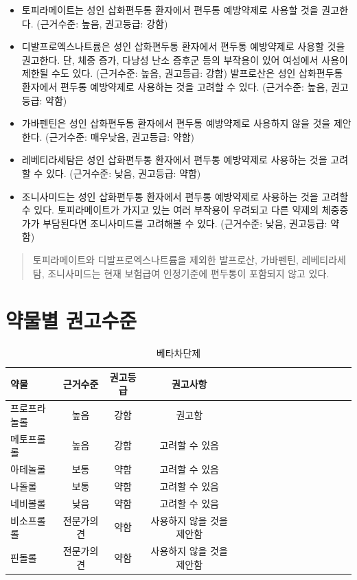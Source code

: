 \documentclass[]{book}
\begin{document}
\begin{itemize}
\item
  토피라메이트는 성인 삽화편두통 환자에서 편두통 예방약제로 사용할 것을 권고한다. (근거수준: 높음, 권고등급: 강함)
\item
  디발프로엑스나트륨은 성인 삽화편두통 환자에서 편두통 예방약제로 사용할 것을 권고한다. 단, 체중 증가, 다낭성 난소 증후군 등의 부작용이 있어 여성에서 사용이 제한될 수도 있다. (근거수준: 높음, 권고등급: 강함) 발프로산은 성인 삽화편두통 환자에서 편두통 예방약제로 사용하는 것을 고려할 수 있다. (근거수준: 높음, 권고등급: 약함)
\item
  가바펜틴은 성인 삽화편두통 환자에서 편두통 예방약제로 사용하지 않을 것을 제안한다. (근거수준: 매우낮음, 권고등급: 약함)
\item
  레베티라세탐은 성인 삽화편두통 환자에서 편두통 예방약제로 사용하는 것을 고려할 수 있다. (근거수준: 낮음, 권고등급: 약함)
\item
  조니사미드는 성인 삽화편두통 환자에서 편두통 예방약제로 사용하는 것을 고려할 수 있다. 토피라메이트가 가지고 있는 여러 부작용이 우려되고 다른 약제의 체중증가가 부담된다면 조니사미드를 고려해볼 수 있다. (근거수준: 낮음, 권고등급: 약함)
\end{itemize}

\begin{quote}
토피라메이트와 디발프로엑스나트륨을 제외한 발프로산, 가바펜틴, 레베티라세탐, 조니사미드는 현재 보험급여 인정기준에 편두통이 포함되지 않고 있다.
\end{quote}

\hypertarget{section-6}{%
\section{약물별 권고수준}\label{section-6}}

\begin{longtable}{lccclccclccclccc}
\caption{\label{tab:unnamed-chunk-2}베타차단제}\\
\toprule
약물 & 근거수준 & 권고등급 & 권고사항\\
\midrule
프로프라놀롤 & 높음 & 강함 & 권고함\\
메토프롤롤 & 높음 & 강함 & 고려할 수 있음\\
아테놀롤 & 보통 & 약함 & 고려할 수 있음\\
나돌롤 & 보통 & 약함 & 고려할 수 있음\\
네비볼롤 & 낮음 & 약함 & 고려할 수 있음\\
\addlinespace
비소프롤롤 & 전문가의견 & 약함 & 사용하지 않을 것을 제안함\\
핀돌롤 & 전문가의견 & 약함 & 사용하지 않을 것을 제안함\\
\bottomrule
\end{longtable}
\end{document}
